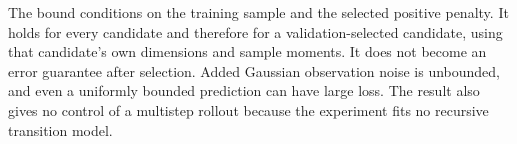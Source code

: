 The bound conditions on the training sample and the selected positive penalty. It holds for every candidate and therefore for a validation-selected candidate, using that candidate's own dimensions and sample moments. It does not become an error guarantee after selection. Added Gaussian observation noise is unbounded, and even a uniformly bounded prediction can have large loss. The result also gives no control of a multistep rollout because the experiment fits no recursive transition model.
